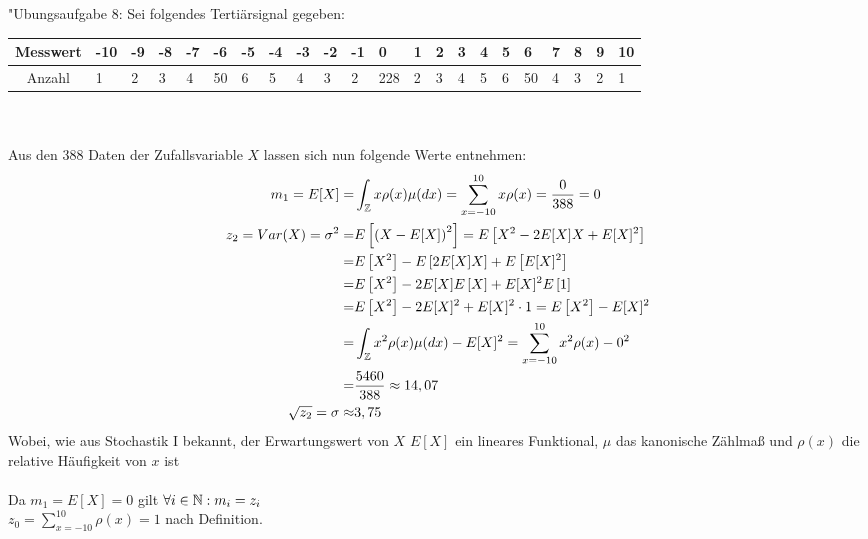 

	"Ubungsaufgabe 8: \newline
	Sei folgendes Tertiärsignal gegeben:\\
	\begin{tabular}{|c|p{0.6cm}|p{0.35cm}|p{0.35cm}|p{0.35cm}|p{0.35cm}|p{0.35cm}|p{0.35cm}|p{0.35cm}|p{0.35cm}|p{0.35cm}|p{0.5cm}|p{0.15cm}|p{0.2cm}|p{0.2cm}|p{0.2cm}|p{0.2cm}|p{0.2cm}|p{0.2cm}|p{0.2cm}|p{0.2cm}|p{0.4cm}|}
		\hline
		Messwert	& -10 & -9 & -8 & -7 & -6 & -5 & -4 & -3 & -2 & -1 & 0 & 1 & 2 & 3 & 4 & 5 & 6 & 7 & 8 & 9 & 10\\
		\hline
		Anzahl		& 1 & 2 & 3 & 4 & 50 & 6 & 5 & 4 & 3 & 2 & 228 & 2 & 3 & 4 & 5 & 6 & 50 & 4 & 3 & 2 & 1\\
		\hline
	\end{tabular}\\
	\\
	Aus den 388 Daten der Zufallsvariable $X$ lassen sich nun folgende Werte entnehmen:
	\begin{align*}
	m_1 = E[X]				=& \int_{\mathbb Z} x\rho(x) \mu(dx) = \sum_{x=-10}^{10} x\rho(x)= \frac{0}{388} = 0\\
	z_2 = Var(X) = \sigma^2	=& E\left[\left(X-E[X]\right)^2\right] = E\left[X^2 - 2E[X]X + E[X]^2\right]\\
	=& E\left[X^2\right] - E\left[2E[X]X\right] + E\left[E[X]^2\right]\\
	=& E\left[X^2\right] - 2E[X]E\left[X\right] + E[X]^2 E\left[1\right]\\
	=& E\left[X^2\right] - 2E[X]^2 + E[X]^2 \cdot 1 = E\left[X^2\right] - E[X]^2\\
	=& \int_{\mathbb Z} x^2\rho(x) \mu(dx) - E[X]^2 = \sum_{x=-10}^{10} x^2\rho(x) - 0^2\\
	=& \frac{5460}{388} \approx 14,07\\
	\sqrt{z_2} = \sigma		\approx& 3,75\\
	\end{align*}
	Wobei, wie aus Stochastik I bekannt, der Erwartungswert von $X$ $E[X]$ ein lineares Funktional, $\mu$ das kanonische Zählmaß und $\rho(x)$ die relative Häufigkeit von $x$ ist\\
	\\
	Da $m_1 = E[X] = 0$ gilt $\forall i\in{\mathbb N}:m_i = z_i$\\
	$z_0 = \sum_{x=-10}^{10} \rho(x) = 1$ nach Definition.\\
